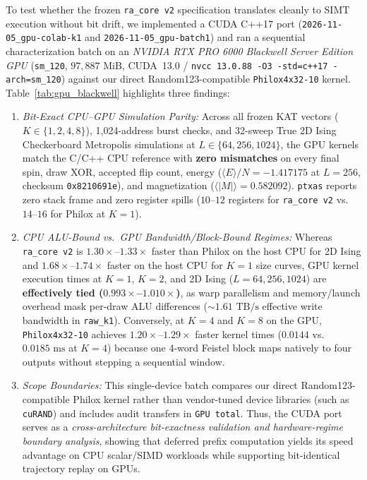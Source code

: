 \documentclass[conference]{IEEEtran}
\begin{document}
To test whether the frozen \texttt{ra\_core v2} specification translates cleanly to SIMT execution without bit drift, we implemented a CUDA C++17 port (\texttt{2026-11-05\_gpu-colab-k1} and \texttt{2026-11-05\_gpu-batch1}) and ran a sequential characterization batch on an \emph{NVIDIA RTX PRO 6000 Blackwell Server Edition GPU} (\texttt{sm\_120}, $97{,}887\text{ MiB}$, CUDA~13.0 / \texttt{nvcc 13.0.88 -O3 -std=c++17 -arch=sm\_120}) against our direct Random123-compatible \texttt{Philox4x32-10} kernel. Table~\ref{tab:gpu_blackwell} highlights three findings:
\begin{enumerate}
    \item \emph{Bit-Exact CPU--GPU Simulation Parity:} Across all frozen KAT vectors ($K \in \{1, 2, 4, 8\}$), 1,024-address burst checks, and 32-sweep True 2D Ising Checkerboard Metropolis simulations at $L \in \{64, 256, 1024\}$, the GPU kernels match the C/C++ CPU reference with \textbf{zero mismatches} on every final spin, draw XOR, accepted flip count, energy ($\langle E \rangle/N = -1.417175$ at $L=256$, checksum \texttt{0x8210691e}), and magnetization ($\langle |M| \rangle = 0.582092$). \texttt{ptxas} reports zero stack frame and zero register spills ($10$--$12$ registers for \texttt{ra\_core v2} vs.\ $14$--$16$ for Philox at $K=1$).
    \item \emph{CPU ALU-Bound vs.\ GPU Bandwidth/Block-Bound Regimes:} Whereas \texttt{ra\_core v2} is $1.30\times$--$1.33\times$ faster than Philox on the host CPU for 2D Ising and $1.68\times$--$1.74\times$ faster on the host CPU for $K=1$ size curves, GPU kernel execution times at $K=1$, $K=2$, and 2D Ising ($L=64, 256, 1024$) are \textbf{effectively tied ($0.993\times$--$1.010\times$)}, as warp parallelism and memory/launch overhead mask per-draw ALU differences ($\sim 1.61\text{ TB/s}$ effective write bandwidth in \texttt{raw\_k1}). Conversely, at $K=4$ and $K=8$ on the GPU, \texttt{Philox4x32-10} achieves $1.20\times$--$1.29\times$ faster kernel times ($0.0144$ vs.\ $0.0185\text{ ms}$ at $K=4$) because one 4-word Feistel block maps natively to four outputs without stepping a sequential window.
    \item \emph{Scope Boundaries:} This single-device batch compares our direct Random123-compatible Philox kernel rather than vendor-tuned device libraries (such as \texttt{cuRAND}) and includes audit transfers in \texttt{GPU total}. Thus, the CUDA port serves as a \emph{cross-architecture bit-exactness validation and hardware-regime boundary analysis}, showing that deferred prefix computation yields its speed advantage on CPU scalar/SIMD workloads while supporting bit-identical trajectory replay on GPUs.
\end{enumerate}
\end{document}
